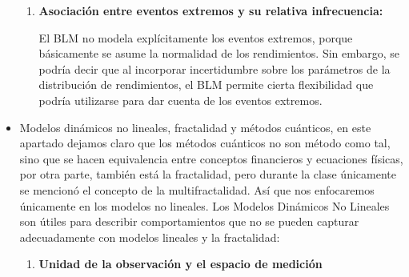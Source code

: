 \begin{problema}
\begin{sol}
\begin{itemize}
\begin{enumerate}
        \item \textbf{Asociación entre eventos extremos y su relativa infrecuencia:}
        
        El BLM no modela explícitamente los eventos extremos, porque básicamente se asume la normalidad de los rendimientos. Sin embargo, se podría decir que al incorporar incertidumbre sobre los parámetros de la distribución de rendimientos, el BLM permite cierta flexibilidad que podría utilizarse para dar cuenta de los eventos extremos.
        
        \end{enumerate}
        
    \item Modelos dinámicos no lineales, fractalidad y métodos cuánticos, en este apartado dejamos claro que los métodos cuánticos no son método como tal, sino que se hacen equivalencia entre conceptos financieros y ecuaciones físicas, por otra parte, también está la fractalidad, pero durante la clase únicamente se mencionó el concepto de la multifractalidad. Así que nos enfocaremos únicamente en los modelos no lineales.  Los Modelos Dinámicos No Lineales son útiles para describir comportamientos que no se pueden capturar adecuadamente con modelos lineales y la fractalidad:

    \begin{enumerate}
    \item \textbf{Unidad de la observación y el espacio de medición}
    

\end{enumerate}
\end{itemize}
\end{sol}
\end{problema}
